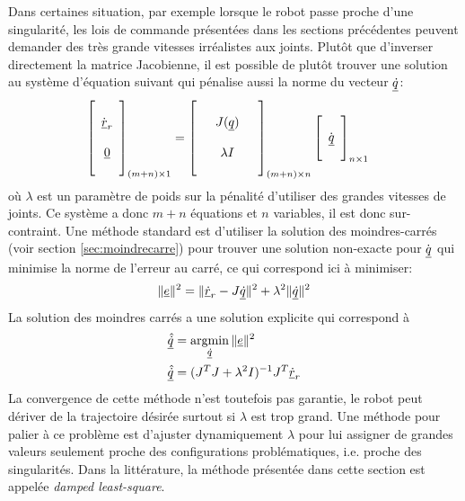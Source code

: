 Dans certaines situation, par exemple lorsque le robot passe proche d'une singularité, les lois de commande présentées dans les sections précédentes peuvent demander des très grande vitesses irréalistes aux joints. Plutôt que d'inverser directement la matrice Jacobienne, il est possible de plutôt trouver une solution au système d'équation suivant qui pénalise aussi la norme du vecteur $\underline{\dot{q}}$:
\begin{align}
\left[ \begin{array}{c}  \\ \dot{\underline{r}}_r \\ \\ \underline{0} \\ \\ 
\end{array} \right]_{(m+n) \times 1}
&= 
\left[ \begin{array}{c c c} 
&&\\
& J(\underline{q}) &\\
&&\\
&\lambda I &\\
&&
\end{array} \right]_{(m + n)  \times n}
\left[ \begin{array}{c} 
\\ \dot{\underline{q}} \\ \\
\end{array} \right]_{n \times 1}
\end{align} 
où $\lambda$ est un paramètre de poids sur la pénalité d'utiliser des grandes vitesses de joints. Ce système a donc $m+n$ équations et $n$ variables, il est donc sur-contraint. Une méthode standard est d'utiliser la solution des moindres-carrés (voir section \ref{sec:moindrecarre}) pour trouver une solution non-exacte pour $\dot{\underline{q}}$ qui minimise la norme de l'erreur au carré, ce qui correspond ici à minimiser:
\begin{align}
\| \underline{e} \|^2 = \| \underline{\dot{r}}_r - J \underline{\dot{q}}   \|^2 + \lambda^2 \| \underline{\dot{q}} \|^2
\end{align} 
La solution des moindres carrés a une solution explicite qui correspond à 
\begin{align}
\col{\hat{\dot{q}}} &= \operatornamewithlimits{argmin}\limits_{\col{\dot{q}}} \| \col{e} \|^2 \\
\col{\hat{\dot{q}}} &= \huge( J^T J + \lambda^2 I \huge)^{-1} J^T  \col{\dot{r}}_r 
\end{align} 
La convergence de cette méthode n'est toutefois pas garantie, le robot peut dériver de la trajectoire désirée surtout si $\lambda$ est trop grand. Une méthode pour palier à ce problème est d'ajuster dynamiquement $\lambda$ pour lui assigner de grandes valeurs seulement proche des configurations problématiques, i.e. proche des singularités. Dans la littérature, la méthode présentée dans cette section est appelée \textit{damped least-square}.

